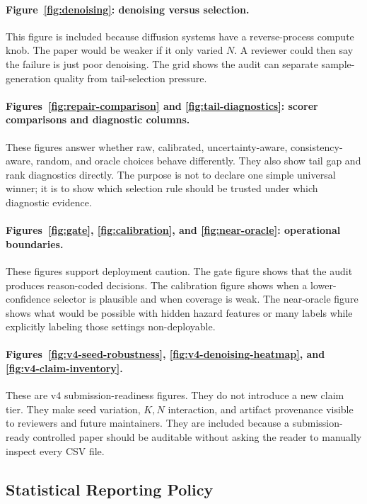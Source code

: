\documentclass{article}
\begin{document}
\paragraph{Figure~\ref{fig:denoising}: denoising versus selection.}
This figure is included because diffusion systems have a reverse-process
compute knob. The paper would be weaker if it only varied $N$. A reviewer
could then say the failure is just poor denoising. The grid shows the audit can
separate sample-generation quality from tail-selection pressure.

\paragraph{Figures~\ref{fig:repair-comparison} and
\ref{fig:tail-diagnostics}: scorer comparisons and diagnostic columns.}
These figures answer whether raw, calibrated, uncertainty-aware,
consistency-aware, random, and oracle choices behave differently. They also
show tail gap and rank diagnostics directly. The purpose is not to declare one
simple universal winner; it is to show which selection rule should be trusted
under which diagnostic evidence.

\paragraph{Figures~\ref{fig:gate}, \ref{fig:calibration}, and
\ref{fig:near-oracle}: operational boundaries.}
These figures support deployment caution. The gate figure shows that the
audit produces reason-coded decisions. The calibration figure shows when a
lower-confidence selector is plausible and when coverage is weak. The
near-oracle figure shows what would be possible with hidden hazard features or
many labels while explicitly labeling those settings non-deployable.

\paragraph{Figures~\ref{fig:v4-seed-robustness},
\ref{fig:v4-denoising-heatmap}, and \ref{fig:v4-claim-inventory}.}
These are v4 submission-readiness figures. They do not introduce a new claim
tier. They make seed variation, $K,N$ interaction, and artifact provenance
visible to reviewers and future maintainers. They are included because a
submission-ready controlled paper should be auditable without asking the
reader to manually inspect every CSV file.

\subsection{Statistical Reporting Policy}
\label{app:v4-stat-policy}
\end{document}
